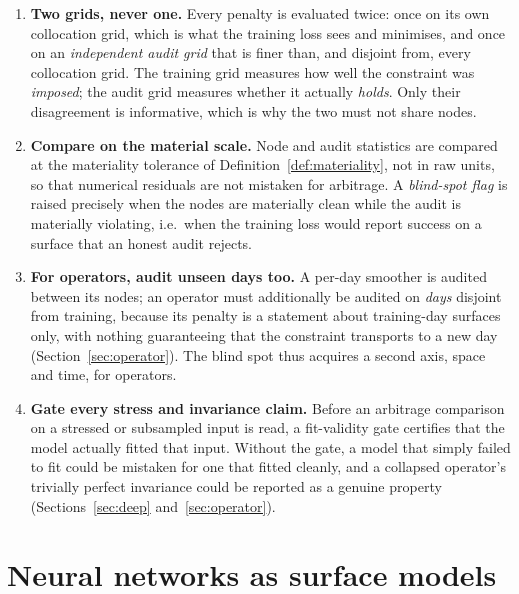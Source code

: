 \begin{enumerate}[label=(A\arabic*)]
\item \textbf{Two grids, never one.} Every penalty is evaluated twice: once on its own
collocation grid, which is what the training loss sees and minimises, and once on an
\emph{independent audit grid} that is finer than, and disjoint from, every collocation grid.
The training grid measures how well the constraint was \emph{imposed}; the audit grid measures
whether it actually \emph{holds}. Only their disagreement is informative, which is why the two
must not share nodes.

\item \textbf{Compare on the material scale.} Node and audit statistics are compared at the
materiality tolerance of Definition~\ref{def:materiality}, not in raw units, so that numerical
residuals are not mistaken for arbitrage. A \emph{blind-spot flag} is raised precisely when the
nodes are materially clean while the audit is materially violating, i.e.\ when the training loss
would report success on a surface that an honest audit rejects.

\item \textbf{For operators, audit unseen days too.} A per-day smoother is audited between its
nodes; an operator must additionally be audited on \emph{days} disjoint from training, because
its penalty is a statement about training-day surfaces only, with nothing guaranteeing that the
constraint transports to a new day (Section~\ref{sec:operator}). The blind spot thus acquires a
second axis, space and time, for operators.

\item \textbf{Gate every stress and invariance claim.} Before an arbitrage comparison on a
stressed or subsampled input is read, a fit-validity gate certifies that the model actually
fitted that input. Without the gate, a model that simply failed to fit could be mistaken for one
that fitted cleanly, and a collapsed operator's trivially perfect invariance could be reported
as a genuine property (Sections~\ref{sec:deep} and~\ref{sec:operator}).
\end{enumerate}

\section{Neural networks as surface models}\label{sec:nnsec}

